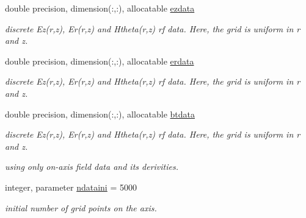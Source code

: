 \textbf{ }\par
\begin{DoxyCompactItemize}
\item 
double precision, dimension(\+:,\+:), allocatable \mbox{\hyperlink{namespacedataclass_a2f3f7950dbca31f394856d31781256f3}{ezdata}}
\begin{DoxyCompactList}\small\item\em discrete Ez(r,z), Er(r,z) and Htheta(r,z) rf data. Here, the grid is uniform in r and z. \end{DoxyCompactList}\item 
double precision, dimension(\+:,\+:), allocatable \mbox{\hyperlink{namespacedataclass_a4f3abc6db52a89363b184d4bec9ebff8}{erdata}}
\begin{DoxyCompactList}\small\item\em discrete Ez(r,z), Er(r,z) and Htheta(r,z) rf data. Here, the grid is uniform in r and z. \end{DoxyCompactList}\item 
double precision, dimension(\+:,\+:), allocatable \mbox{\hyperlink{namespacedataclass_a09d27eeab42c3e3369268d8ce133a2c0}{btdata}}
\begin{DoxyCompactList}\small\item\em discrete Ez(r,z), Er(r,z) and Htheta(r,z) rf data. Here, the grid is uniform in r and z. \end{DoxyCompactList}\end{DoxyCompactItemize}

\textbf{ }\par
{\em using only on-\/axis field data and its derivities. }\begin{DoxyCompactItemize}
\item 
integer, parameter \mbox{\hyperlink{namespacedataclass_a2578bbe9c4dc0892ee08a8619cd7e978}{ndataini}} = 5000
\begin{DoxyCompactList}\small\item\em initial number of grid points on the axis. \end{DoxyCompactList}\end{DoxyCompactItemize}

